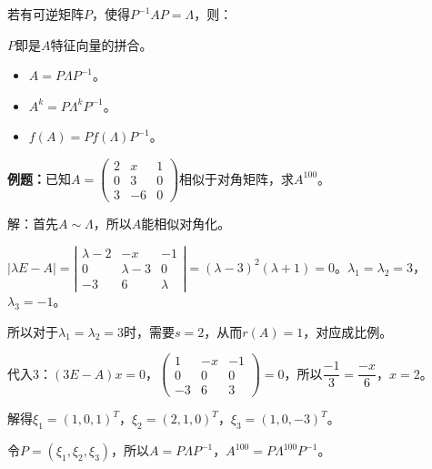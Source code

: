 若有可逆矩阵$P$，使得$P^{-1}AP=\Lambda$，则：

$P$即是$A$特征向量的拼合。

\begin{itemize}
    \item $A=P\Lambda P^{-1}$。
    \item $A^k=P\Lambda^kP^{-1}$。
    \item $f(A)=Pf(\Lambda)P^{-1}$。
\end{itemize}

\textbf{例题：}已知$A=\left(\begin{array}{ccc}
    2 & x & 1 \\
    0 & 3 & 0 \\
    3 & -6 & 0
\end{array}\right)$相似于对角矩阵，求$A^{100}$。\medskip

解：首先$A\sim\Lambda$，所以$A$能相似对角化。

$\vert\lambda E-A\vert=\left|\begin{array}{ccc}
    \lambda-2 & -x & -1 \\
    0 & \lambda-3 & 0 \\
    -3 & 6 & \lambda
\end{array}\right|=(\lambda-3)^2(\lambda+1)=0$。$\lambda_1=\lambda_2=3$，$\lambda_3=-1$。

所以对于$\lambda_1=\lambda_2=3$时，需要$s=2$，从而$r(A)=1$，对应成比例。

代入3：$(3E-A)x=0$，$\left(\begin{array}{ccc}
    1 & -x & -1 \\
    0 & 0 & 0 \\
    -3 & 6 & 3
\end{array}\right)=0$，所以$\dfrac{-1}{3}=\dfrac{-x}{6}$，$x=2$。

解得$\xi_1=(1,0,1)^T$，$\xi_2=(2,1,0)^T$，$\xi_3=(1,0,-3)^T$。

令$P=(\xi_1,\xi_2,\xi_3)$，所以$A=P\Lambda P^{-1}$，$A^{100}=P\Lambda^{100}P^{-1}$。
